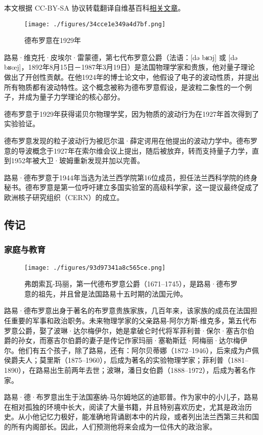 
本文根据 CC-BY-SA 协议转载翻译自维基百科\href{https://en.wikipedia.org/wiki/Louis_de_Broglie}{相关文章}。

\begin{figure}[ht]
\centering
\texttt{[image: ./figures/34cce1e349a4d7bf.png]}
\caption{德布罗意在1929年} \label{fig_Brogli_1}
\end{figure}
路易·维克托·皮埃尔·雷蒙德，第七代布罗意公爵（法语：[də bʁɔj] 或 [də bʁœj]，1892年8月15日－1987年3月19日）是法国物理学家和贵族，他对量子理论做出了开创性贡献。在他1924年的博士论文中，他假设了电子的波动性质，并提出所有物质都有波动特性。这个概念被称为德布罗意假设，是波粒二象性的一个例子，并成为量子力学理论的核心部分。

德布罗意于1929年获得诺贝尔物理学奖，因为物质的波动行为在1927年首次得到了实验验证。

德布罗意发现的粒子波动行为被厄尔温·薛定谔用在他提出的波动力学中。德布罗意的导波概念于1927年在索尔维会议上提出，随后被放弃，转而支持量子力学，直到1952年被大卫·玻姆重新发现并加以完善。

路易·德布罗意于1944年当选为法兰西学院第16位成员，担任法兰西科学院的终身秘书。德布罗意是第一位呼吁建立多国实验室的高级科学家，这一提议最终促成了欧洲核子研究组织（CERN）的成立。
\subsection{传记}  
\subsubsection{家庭与教育}
\begin{figure}[ht]
\centering
\texttt{[image: ./figures/93d97341a8c565ce.png]}
\caption{弗朗索瓦-玛丽，第一代德布罗意公爵（1671–1745），是路易·德布罗意的祖先，并且曾是法国路易十五时期的法国元帅。} \label{fig_Brogli_2}
\end{figure}
路易·德布罗意出身于著名的布罗意贵族家族，几百年来，该家族的成员在法国担任重要的军事和政治职务。未来物理学家的父亲路易-阿尔方斯-维克多，第五代布罗意公爵，娶了波琳·达尔梅伊尔，她是拿破仑时代将军菲利普·保尔·塞吉尔伯爵的孙女，而塞吉尔伯爵的妻子是传记作家玛丽·塞勒斯廷·阿梅丽·达尔梅伊尔。他们有五个孩子，除了路易，还有：阿尔贝蒂娜（1872–1946），后来成为卢佩侯爵夫人；莫里斯（1875–1960），后成为著名的实验物理学家；菲利普（1881–1890），在路易出生前两年去世；波琳，潘日女伯爵（1888–1972），后成为著名作家。

路易·德·布罗意出生于法国塞纳-马尔姆地区的迪耶普。作为家中的小儿子，路易在相对孤独的环境中长大，阅读了大量书籍，并且特别喜欢历史，尤其是政治历史。从小他记忆力极好，能准确地背诵剧本中的片段，或者列出法兰西第三共和国的所有内阁部长。因此，人们预测他将来会成为一位伟大的政治家。

